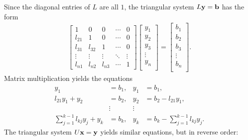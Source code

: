 Since the diagonal entries of $L$ are all $1$, the triangular system $L\mathbf{y} = \mathbf{b}$ has the form
\begin{align*}
\left[\begin{array}{ccccc}
1      & 0      & 0      & \cdots & 0 \\
l_{21} & 1      & 0      & \cdots & 0 \\
l_{31} & l_{32} & 1      & \cdots & 0 \\
\vdots & \vdots & \vdots & \ddots & \vdots \\
l_{n1} & l_{n2} & l_{n3} & \cdots & 1
\end{array}\right]
\left[\begin{array}{c}
y_1 \\ y_2 \\ y_3 \\ \vdots \\ y_n \\
\end{array}\right]
=
\left[\begin{array}{c}
b_1 \\ b_2 \\ b_3 \\ \vdots \\ b_n \\
\end{array}\right].
\end{align*}
Matrix multiplication yields the equations
%
\begin{align}
\nonumber y_1 &= b_1, & y_1 &= b_1, \\
\nonumber l_{21}y_1 + y_2 &= b_2, & y_2 &= b_2 - l_{21}y_1, \\
\nonumber & \vdots & \vdots & \\
\sum_{j=1}^{k-1}l_{kj}y_j + y_k &= b_k, & y_k &= b_k - \sum_{j=1}^{k-1}l_{kj}y_j.
\label{eq:forward-substitution}
\end{align}
The triangular system $U\mathbf{x} = \mathbf{y}$ yields similar equations, but in reverse order:

